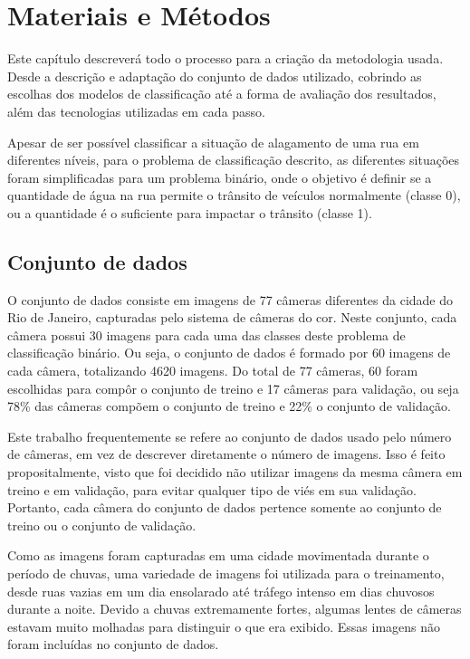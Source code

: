 \chapter{Materiais e Métodos}\label{cap:metodologia}

Este capítulo descreverá todo o processo para a criação da metodologia usada. 
Desde a descrição e adaptação do conjunto de dados utilizado, cobrindo as escolhas dos modelos de classificação até a forma de avaliação dos resultados, 
além das tecnologias utilizadas em cada passo.

Apesar de ser possível classificar a situação de alagamento de uma rua em diferentes níveis, para o problema de classificação descrito, 
as diferentes situações foram simplificadas para um problema binário, onde o objetivo é definir se a quantidade de água na rua permite o trânsito de veículos normalmente (classe 0), 
ou a quantidade é o suficiente para impactar o trânsito (classe 1).

\section{Conjunto de dados}\label{sec:dataset}


O conjunto de dados consiste em imagens de 77 câmeras diferentes da cidade do Rio de Janeiro, capturadas pelo sistema de câmeras do \Acrfull{cor}. 
Neste conjunto, cada câmera possui 30 imagens para cada uma das classes deste problema de classificação binário. 
Ou seja, o conjunto de dados é formado por 60 imagens de cada câmera, totalizando 4620 imagens. 
Do total de 77 câmeras, 60 foram escolhidas para compôr o conjunto de treino e 17 câmeras para validação, ou seja 78\% das câmeras compõem o conjunto de treino e 22\% o conjunto de validação.

Este trabalho frequentemente se refere ao conjunto de dados usado pelo número de câmeras, em vez de descrever diretamente o número de imagens.
Isso é feito propositalmente, visto que foi decidido não utilizar imagens da mesma câmera em treino e em validação, para evitar qualquer tipo de viés em sua validação.
Portanto, cada câmera do conjunto de dados pertence somente ao conjunto de treino ou o conjunto de validação.

Como as imagens foram capturadas em uma cidade movimentada durante o período de chuvas, uma variedade de imagens foi utilizada para o treinamento, 
desde ruas vazias em um dia ensolarado até tráfego intenso em dias chuvosos durante a noite.
Devido a chuvas extremamente fortes, algumas lentes de câmeras estavam muito molhadas para distinguir o que era exibido. Essas imagens não foram incluídas no conjunto de dados.

